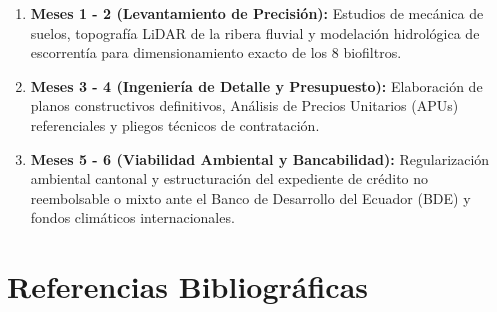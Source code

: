 \documentclass[
  spanish,
  letterpaper,
  DIV=11,
  numbers=noendperiod]{scrartcl}
\providecommand{\tightlist}{%
  \setlength{\itemsep}{0pt}\setlength{\parskip}{0pt}}
\begin{document}
\begin{enumerate}
\def\labelenumi{\arabic{enumi}.}
\tightlist
\item
  \textbf{Meses 1 - 2 (Levantamiento de Precisión):} Estudios de
  mecánica de suelos, topografía LiDAR de la ribera fluvial y modelación
  hidrológica de escorrentía para dimensionamiento exacto de los 8
  biofiltros.
\item
  \textbf{Meses 3 - 4 (Ingeniería de Detalle y Presupuesto):}
  Elaboración de planos constructivos definitivos, Análisis de Precios
  Unitarios (APUs) referenciales y pliegos técnicos de contratación.
\item
  \textbf{Meses 5 - 6 (Viabilidad Ambiental y Bancabilidad):}
  Regularización ambiental cantonal y estructuración del expediente de
  crédito no reembolsable o mixto ante el Banco de Desarrollo del
  Ecuador (BDE) y fondos climáticos internacionales.
\end{enumerate}

\section*{Referencias
Bibliográficas}\label{referencias-bibliogruxe1ficas}
\end{document}
